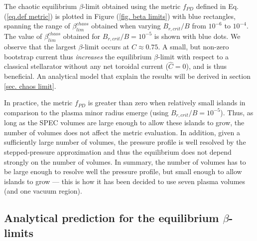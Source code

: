 \documentclass[my_thesis.tex]{subfiles}
\begin{document}
The chaotic equilibrium $\beta$-limit obtained using the metric $f_{PD}$ defined in Eq.(\ref{eq.def metric}) is plotted in Figure (\ref{fig. beta limits}) with blue rectangles, spanning the range of $\beta_{lim}^{chaos}$ obtained when varying $ B_{r,crit}/B$ from $10^{-6}$ to $10^{-4}$. The value of $\beta^{chaos}_{lim}$ obtained for $ B_{r,crit}/B = 10^{-5}$ is shown with blue dots. We observe that the largest $\beta$-limit occurs at $\hat{C}\approx0.75$. A small, but non-zero bootstrap current thus \emph{increases} the equilibrium $\beta$-limit with respect to a classical stellarator without any net toroidal current ($\hat{C}=0$), and is thus beneficial. An analytical model that explain the results will be derived in section \ref{sec. chaos limit}.

In practice, the metric $f_{PD}$ is greater than zero when relatively small islands in comparison to the plasma minor radius emerge (using $ B_{r,crit}/B=10^{-5}$). Thus, as long as the SPEC volumes are large enough to allow these islands to grow, the number of volumes does not affect the metric evaluation. In addition, given a sufficiently large number of volumes, the pressure profile is well resolved by the stepped-pressure approximation and thus the equilibrium does not depend strongly on the number of volumes. In summary, the number of volumes has to be large enough to resolve well the pressure profile, but small enough to allow islands to grow --- this is how it has been decided to use seven plasma volumes (and one vacuum region).




\subsection{Analytical prediction for the equilibrium $\beta$-limits}\label{sec.analyticalmodel}
\end{document}
